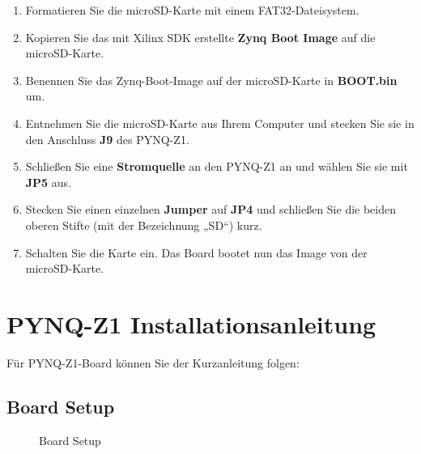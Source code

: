 \documentclass[a4paper]{report}
\begin{document}
	\begin{enumerate} 
	
		\item Formatieren Sie die microSD-Karte mit einem FAT32-Dateisystem.
		\item Kopieren Sie das mit Xilinx SDK erstellte \textbf{Zynq Boot Image} auf die microSD-Karte.
		\item Benennen Sie das Zynq-Boot-Image auf der microSD-Karte in\textbf{ BOOT.bin }um.
		\item Entnehmen Sie die microSD-Karte aus Ihrem Computer und stecken Sie sie in den Anschluss\textbf{ J9} des PYNQ-Z1.
		\item Schließen Sie eine\textbf{ Stromquelle} an den PYNQ-Z1 an und wählen Sie sie mit\textbf{ JP5 }aus.
		\item Stecken Sie einen einzelnen\textbf{ Jumper} auf \textbf{ JP4 } und schließen Sie die beiden oberen Stifte (mit der Bezeichnung „SD“) kurz.
		\item Schalten Sie die Karte ein. Das Board bootet nun das Image von der microSD-Karte.

	\end{enumerate}

\section{PYNQ-Z1 Installationsanleitung}
Für PYNQ-Z1-Board können Sie der Kurzanleitung folgen:


\subsection{Board Setup}

	\begin{figure}[H]
	\centering
	\caption{Board Setup}
	\label{fig:Board_Setup}
	\end{figure}
\end{document}
